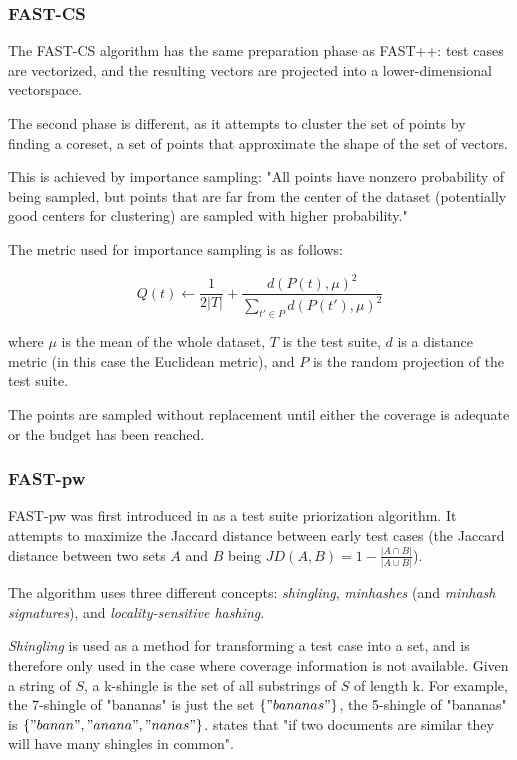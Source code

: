 \subsubsection{FAST-CS}

The FAST-CS algorithm has the same preparation phase as FAST++: test
cases are vectorized, and the resulting vectors are projected into a
lower-dimensional vectorspace.

The second phase is different, as it attempts to cluster the set of
points by finding a coreset, a set of points that approximate the shape
of the set of vectors.


This is achieved by importance sampling: "All points have nonzero
probability of being sampled, but points that are far from the center
of the dataset (potentially good centers for clustering) are sampled
with higher probability."

The metric used for importance sampling is as follows:

$$
	Q(t) \leftarrow \frac{1}{2|T|}+\frac{d(P(t),\mu)^2}{\sum_{t' \in P}d(P(t'),\mu)^2}
$$

where $\mu$ is the mean of the whole dataset, $T$ is the test suite,
$d$ is a distance metric (in this case the Euclidean metric), and $P$
is the random projection of the test suite.

The points are sampled without replacement until either the coverage is
adequate or the budget has been reached.

\subsubsection{FAST-pw}

FAST-pw was first introduced in \cite{miranda2018fast} as a test suite
priorization algorithm. It attempts to maximize the Jaccard distance
between early test cases (the Jaccard distance between two sets $A$
and $B$ being $JD(A, B)=1-\frac{|A \cap B|}{|A \cup B|}$).

The algorithm uses three different concepts: \textit{shingling},
\textit{minhashes} (and \textit{minhash signatures}), and
\textit{locality-sensitive hashing}.

\textit{Shingling} is used as a method for transforming a test case into
a set, and is therefore only used in the case where coverage information
is not available. Given a string of $S$, a k-shingle is the set of all
substrings of $S$ of length k. For example, the 7-shingle of "bananas"
is just the set $\{"bananas"\}$, the 5-shingle of "bananas" is $\{"banan",
"anana", "nanas"\}$. \cite{miranda2018fast} states that "if two documents
are similar they will have many shingles in common".

